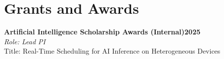 \documentclass[letterpaper,10pt]{article}
\newcommand{\heading}[2]{
  \hspace{10pt}#1\hfill#2\\
}
\newcommand{\headingBf}[2]{
  \heading{\textbf{#1}}{\textbf{#2}}
}
\newcommand{\headingIt}[2]{
  \heading{\textit{#1}}{\textit{#2}}
}
\newenvironment{resume_list}{
  \vspace{-7pt}
  \begin{itemize}[itemsep=-2px, parsep=1pt, leftmargin=30pt]
}{
  \end{itemize}
}
\newcommand{\itemTitle}[1]{
  \item[] \underline{#1}\vspace{4pt}
}
\begin{document}
\section{Grants and Awards}
\headingBf{Artificial Intelligence Scholarship Awards (Internal)}{2025}
\headingIt{Role: Lead PI}{}
\heading{Title: Real-Time Scheduling for AI Inference on Heterogeneous Devices}{}
    



\end{document}
